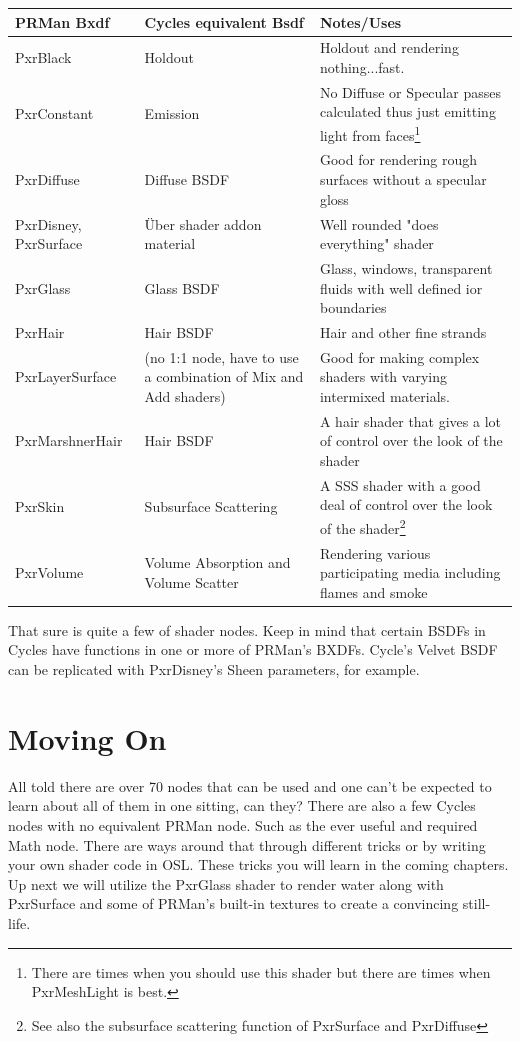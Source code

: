 \begin{tabular}{|p{1.5in}|p{2in}|p{3in}|}
	\hline
	PRMan Bxdf		& Cycles equivalent Bsdf	& Notes/Uses \\ 
	\hline
	PxrBlack		& Holdout					& Holdout and rendering nothing...fast.\\
	PxrConstant		& Emission					& No Diffuse or Specular passes calculated thus just emitting light from faces\footnote{There are times when you should use this shader but there are times when PxrMeshLight is best.}\\
	PxrDiffuse		& Diffuse BSDF				& Good for rendering rough surfaces without a specular gloss\\
	PxrDisney, PxrSurface & Über shader addon material & Well rounded "does everything" shader\\
	PxrGlass		& Glass BSDF				& Glass, windows, transparent fluids with well defined ior boundaries\\
	PxrHair			& Hair BSDF					& Hair and other fine strands\\
	PxrLayerSurface	& (no 1:1 node, have to use a combination of Mix and Add shaders)	& Good for making complex shaders with varying intermixed materials.\\
	PxrMarshnerHair	& Hair BSDF					& A hair shader that gives a lot of control over the look of the shader \\
	PxrSkin			& Subsurface Scattering		& A SSS shader with a good deal of control over the look of the shader\footnote{See also the subsurface scattering function of PxrSurface and PxrDiffuse}\\
	PxrVolume		& Volume Absorption and Volume Scatter	& Rendering various participating media including flames and smoke\\	
	\hline
\end{tabular}

That sure is quite a few of shader nodes.  Keep in mind that certain BSDFs in Cycles have functions in one or more of PRMan's BXDFs.  Cycle's \textsf{Velvet BSDF} can be replicated with \textsf{PxrDisney}'s \textsf{Sheen} parameters, for example.
\section{Moving On}
All told there are over 70 nodes that can be used and one can't be expected to learn about all of them in one sitting, can they?  There are also a few Cycles nodes with no equivalent PRMan node.  Such as the ever useful and required \textsf{Math} node.  There are ways around that through different tricks or by writing your own shader code in OSL.  These tricks you will learn in the coming chapters.  Up next we will utilize the \textsf{PxrGlass} shader to render water along with \textsf{PxrSurface} and some of PRMan's built-in textures to create a convincing still-life.

